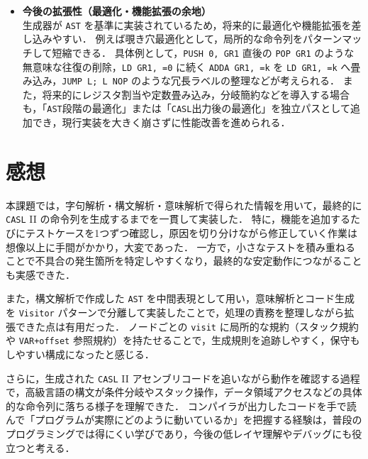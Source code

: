 \documentclass[a4j,10pt]{jarticle}
\begin{document}
\begin{itemize}
  \item \textbf{今後の拡張性（最適化・機能拡張の余地）}\\
  生成器が \verb|AST| を基準に実装されているため，将来的に最適化や機能拡張を差し込みやすい．
  例えば覗き穴最適化として，局所的な命令列をパターンマッチして短縮できる．
  具体例として，\texttt{PUSH 0, GR1} 直後の \texttt{POP GR1} のような無意味な往復の削除，\texttt{LD GR1, =0} に続く \texttt{ADDA GR1, =k} を \texttt{LD GR1, =k} へ畳み込み，\texttt{JUMP L; L NOP} のような冗長ラベルの整理などが考えられる．
  また，将来的にレジスタ割当や定数畳み込み，分岐簡約などを導入する場合も，「\verb|AST|段階の最適化」または「\verb|CASL|出力後の最適化」を独立パスとして追加でき，現行実装を大きく崩さずに性能改善を進められる．
\end{itemize}


\section{感想}
本課題では，字句解析・構文解析・意味解析で得られた情報を用いて，最終的に \texttt{CASL} II の命令列を生成するまでを一貫して実装した．
特に，機能を追加するたびにテストケースを1つずつ確認し，原因を切り分けながら修正していく作業は想像以上に手間がかかり，大変であった．
一方で，小さなテストを積み重ねることで不具合の発生箇所を特定しやすくなり，最終的な安定動作につながることも実感できた．

また，構文解析で作成した \texttt{AST} を中間表現として用い，意味解析とコード生成を \texttt{Visitor} パターンで分離して実装したことで，処理の責務を整理しながら拡張できた点は有用だった．
ノードごとの \texttt{visit} に局所的な規約（スタック規約や \texttt{VAR+offset} 参照規約）を持たせることで，生成規則を追跡しやすく，保守もしやすい構成になったと感じる．

さらに，生成された \texttt{CASL} II アセンブリコードを追いながら動作を確認する過程で，高級言語の構文が条件分岐やスタック操作，データ領域アクセスなどの具体的な命令列に落ちる様子を理解できた．
コンパイラが出力したコードを手で読んで「プログラムが実際にどのように動いているか」を把握する経験は，普段のプログラミングでは得にくい学びであり，今後の低レイヤ理解やデバッグにも役立つと考える．
\end{document}
